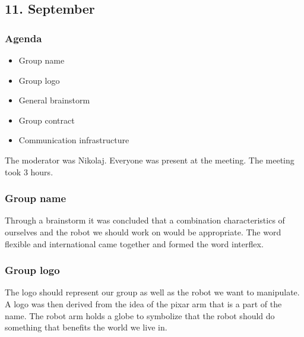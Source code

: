 \subsection*{11. September}
\subsubsection{Agenda}
\begin{itemize}
\item Group name
\item Group logo
\item General brainstorm
\item Group contract
\item Communication infrastructure
\end{itemize}
The moderator was Nikolaj.
Everyone was present at the meeting.
The meeting took 3 hours.

\subsubsection{Group name}
Through a brainstorm it was concluded that a combination characteristics of ourselves and the robot we should work on would be appropriate.
The word flexible and international came together and formed the word interflex. 
\subsubsection{Group logo}
The logo should represent our group as well as the robot we want to manipulate.
A logo was then derived from the idea of the pixar arm that is a part of the name.
The robot arm holds a globe to symbolize that the robot should do something that benefits the world we live in.
